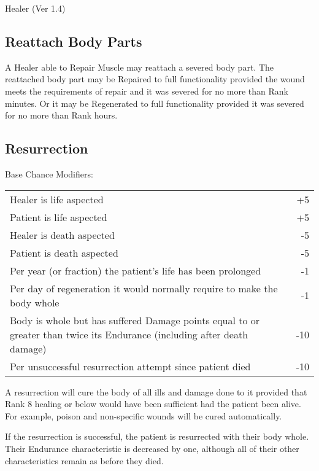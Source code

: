 \begin{Chapter}{Healer (Ver 1.4)}
\subsection{Reattach Body Parts}

A Healer able to Repair Muscle may reattach a severed body part.  The
reattached body part may be Repaired to full functionality provided
the wound meets the requirements of repair and it was severed for no
more than Rank minutes. Or it may be Regenerated to full functionality
provided it was severed for no more than Rank hours.

\subsection{Resurrection}


Base Chance Modifiers: 

\begin{tabularx}{\columnwidth}{Xr}
Healer is life aspected			& +5 \\
Patient is life aspected		& +5 \\
Healer is death aspected		& -5 \\
Patient is death aspected		& -5 \\
Per year (or fraction) the patient’s life has been prolonged & -1 \\
Per day of regeneration it would normally require to make the body whole & -1 \\
Body is whole but has suffered Damage points equal to or greater than twice its Endurance (including after death damage) & -10 \\
Per unsuccessful resurrection attempt since patient died  & -10 \\
\end{tabularx}

A resurrection will cure the body of all ills and damage done to it
provided that Rank 8 healing or below would have been sufficient had
the patient been alive.  For example, poison and non-specific wounds
will be cured automatically.

If the resurrection is successful, the patient is resurrected with
their body whole.  Their Endurance characteristic is decreased by one,
although all of their other characteristics remain as before they
died.


\end{Chapter}

